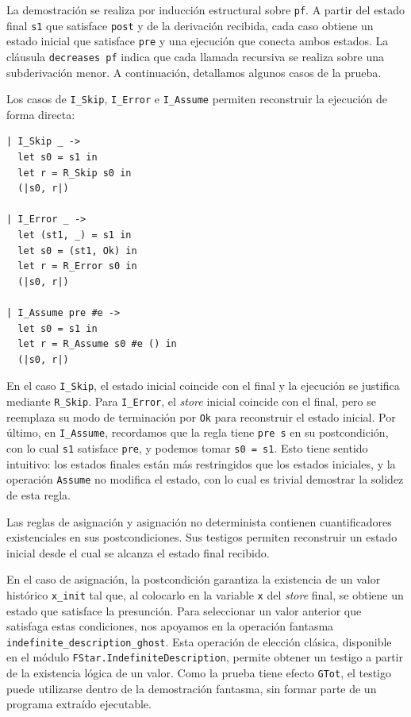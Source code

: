 \documentclass[a4paper,	11pt]{report}
\begin{document}
La demostración se realiza por inducción estructural sobre \lstinline|pf|.
A partir del estado final \lstinline|s1| que satisface \lstinline|post| y de la derivación recibida,
cada caso obtiene un estado inicial que satisface \lstinline|pre| y una ejecución que conecta ambos estados.
La cláusula \lstinline|decreases pf| indica que cada llamada recursiva se realiza sobre una subderivación menor.
A continuación,
detallamos algunos casos de la prueba.

Los casos de \lstinline|I_Skip|,
\lstinline|I_Error| e \lstinline|I_Assume| permiten reconstruir la ejecución de forma directa:

\begin{lstlisting}
| I_Skip _ ->
  let s0 = s1 in
  let r = R_Skip s0 in
  (|s0, r|)

| I_Error _ ->
  let (st1, _) = s1 in
  let s0 = (st1, Ok) in
  let r = R_Error s0 in
  (|s0, r|)

| I_Assume pre #e ->
  let s0 = s1 in
  let r = R_Assume s0 #e () in
  (|s0, r|)
\end{lstlisting}

En el caso \lstinline|I_Skip|,
el estado inicial coincide con el final y la ejecución se justifica mediante \lstinline|R_Skip|.
Para \lstinline|I_Error|,
el \emph{store} inicial coincide con el final,
pero se reemplaza su modo de terminación por \lstinline|Ok| para reconstruir el estado inicial.
Por último,
en \lstinline|I_Assume|,
recordamos que la regla tiene \lstinline|pre s| en su postcondición,
con lo cual \lstinline|s1| satisface \lstinline|pre|,
y podemos tomar \lstinline|s0 = s1|.
Esto tiene sentido intuitivo:
los estados finales están más restringidos que los estados iniciales,
y la operación \lstinline|Assume| no modifica el estado,
con lo cual es trivial demostrar la solidez de esta regla.

Las reglas de asignación y asignación no determinista contienen cuantificadores existenciales en sus postcondiciones.
Sus testigos permiten reconstruir un estado inicial desde el cual se alcanza el estado final recibido.

En el caso de asignación,
la postcondición garantiza la existencia de un valor histórico \lstinline|x_init| tal que,
al colocarlo en la variable \lstinline|x| del \emph{store} final,
se obtiene un estado que satisface la presunción.
Para seleccionar un valor anterior que satisfaga estas condiciones,
nos apoyamos en la operación fantasma \lstinline|indefinite_description_ghost|.
Esta operación de elección clásica,
disponible en el módulo \lstinline|FStar.IndefiniteDescription|,
permite obtener un testigo a partir de la existencia lógica de un valor.
Como la prueba tiene efecto \lstinline|GTot|,
el testigo puede utilizarse dentro de la demostración fantasma,
sin formar parte de un programa extraído ejecutable.
\end{document}
